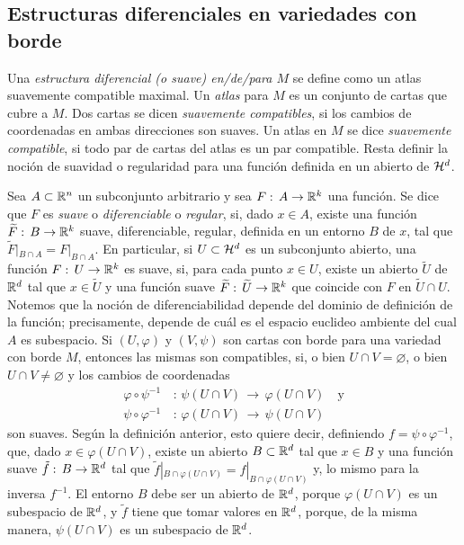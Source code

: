 \subsection{Estructuras diferenciales en variedades con borde}
Una \emph{estructura diferencial (o suave) en/de/para $M$} se define como un
atlas suavemente compatible maximal. Un \emph{atlas} para $M$ es un conjunto
de cartas que cubre a $M$. Dos cartas se dicen \emph{suavemente compatibles},
si los cambios de coordenadas en ambas direcciones son suaves. Un
atlas en $M$ se dice \emph{suavemente compatible}, si todo par de cartas
del atlas es un par compatible. Resta definir la noci\'{o}n de suavidad o
regularidad para una funci\'{o}n definida en un abierto de $\hemi[d]$.

Sea $A\subset\bb{R}^{n}$ un subconjunto arbitrario y sea
$F:\,A\rightarrow\bb{R}^{k}$ una funci\'{o}n. Se dice que $F$ es \emph{suave}
o \emph{diferenciable} o \emph{regular}, si, dado $x\in A$, existe una
funci\'{o}n $\widetilde{F}:\,B\rightarrow\bb{R}^{k}$ suave, diferenciable,
regular, definida en un entorno $B$ de $x$, tal que
$\widetilde{F}|_{B\cap A}=F|_{B\cap A}$. En particular, si $U\subset\hemi[d]$
es un subconjunto abierto, una funci\'{o}n $F:\,U\rightarrow\bb{R}^{k}$ es
suave, si, para cada punto $x\in U$, existe un abierto $\widetilde{U}$ de
$\bb{R}^{d}$ tal que $x\in\widetilde{U}$ y una funci\'{o}n suave
$\widetilde{F}:\,\widetilde{U}\rightarrow\bb{R}^{k}$ que coincide con
$F$ en $\widetilde{U}\cap U$. Notemos que la noci\'{o}n de diferenciabilidad
depende del dominio de definici\'{o}n de la funci\'{o}n; precisamente,
depende de cu\'{a}l es el espacio euclideo ambiente del cual $A$ es
subespacio. Si $(U,\varphi)$ y $(V,\psi)$ son cartas con borde para
una variedad con borde $M$, entonces las mismas son compatibles, si,
o bien $U\cap V=\varnothing$, o bien $U\cap V\not=\varnothing$ y
los cambios de coordenadas
\begin{align*}
	\varphi\circ\psi^{-1} & \,:\,\psi(U\cap V)\,\rightarrow\,
		\varphi(U\cap V)\quad\text{y} \\
	\psi\circ\varphi^{-1} & \,:\,\varphi(U\cap V)\,\rightarrow\,
		\psi(U\cap V)
\end{align*}
%
son suaves. Seg\'{u}n la definici\'{o}n anterior, esto quiere decir,
definiendo $f=\psi\circ\varphi^{-1}$, que, dado $x\in \varphi(U\cap V)$,
existe un abierto $B\subset\bb{R}^{d}$ tal que $x\in B$ y una
funci\'{o}n suave $\tilde{f}:\,B\rightarrow\bb{R}^{d}$ tal que
$\tilde{f}|_{B\cap\varphi(U\cap V)}=f|_{B\cap\varphi(U\cap V)}$ y,
lo mismo para la inversa $f^{-1}$. El entorno $B$ debe ser un abierto de
$\bb{R}^{d}$, porque $\varphi(U\cap V)$ es un subespacio de $\bb{R}^{d}$, y
$\tilde{f}$ tiene que tomar valores en $\bb{R}^{d}$, porque,
de la misma manera, $\psi(U\cap V)$ es un subespacio de $\bb{R}^{d}$.

